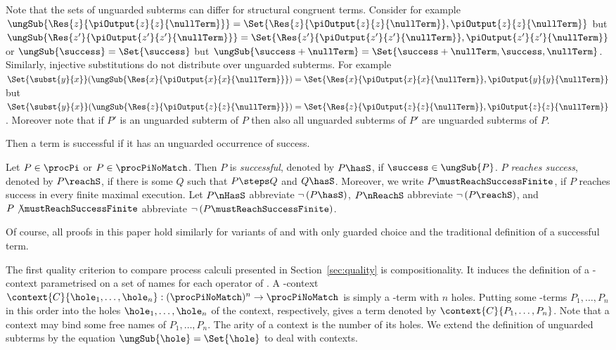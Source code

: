 \documentclass[final,copyright,creativecommons]{eptcs}
\begin{document}
\noindent
Note that the sets of unguarded subterms can differ for structural congruent terms. Consider for example $ \ungSub{\Res{z}{\piOutput{z}{z}{\nullTerm}}} = \Set{ \Res{z}{\piOutput{z}{z}{\nullTerm}}, \piOutput{z}{z}{\nullTerm} } $ but $ \ungSub{\Res{z'}{\piOutput{z'}{z'}{\nullTerm}}} = \Set{ \Res{z'}{\piOutput{z'}{z'}{\nullTerm}}, \piOutput{z'}{z'}{\nullTerm} } $
or $ \ungSub{\success} = \Set{ \success } $ but $ \ungSub{\success + \nullTerm} = \Set{ \success + \nullTerm, \success, \nullTerm } $.
Similarly, injective substitutions do not distribute over unguarded subterms.
For example $ \Set{ \subst{y}{x} }\!\left( \ungSub{\Res{x}{\piOutput{x}{x}{\nullTerm}}} \right) = \Set{ \Res{x}{\piOutput{x}{x}{\nullTerm}}, \piOutput{y}{y}{\nullTerm} } $ but $ \Set{ \subst{y}{x} }\!\left( \ungSub{\Res{z}{\piOutput{z}{z}{\nullTerm}}} \right) = \Set{ \Res{z}{\piOutput{z}{z}{\nullTerm}}, \piOutput{z}{z}{\nullTerm} } $.
Moreover note that if $ P' $ is an unguarded subterm of $ P $ then also all unguarded subterms of $ P' $ are unguarded subterms of $ P $.

Then a term is successful if it has an unguarded occurrence of success.

\begin{definition}
	Let $ P \in \procPi $ or $ P \in \procPiNoMatch $. Then $ P $ is \emph{successful}, denoted by $ P \hasS $, if $ \success \in \ungSub{P} $.
	\emph{$ P $ reaches success}, denoted by $ P \reachS $, if there is some $ Q $ such that $ P \steps Q $ and $ Q \hasS $.
	Moreover, we write $ P \mustReachSuccessFinite $, if $ P $ reaches success in every finite maximal execution.
Let $ P \nHasS $ abbreviate $ \neg \left( P \hasS \right) $, $ P \nReachS $ abbreviate $ \neg \left( P \reachS \right) $, and $ P \not\mustReachSuccessFinite $ abbreviate $ \neg \left( P \mustReachSuccessFinite \right) $.
\end{definition}

\noindent
Of course, all proofs in this paper hold similarly for variants of \piT and \piNM with only guarded choice and the traditional definition of a successful term.

The first quality criterion to compare process calculi presented in Section~\ref{sec:quality} is compositionality. It induces the definition of a \piNM-context parametrised on a set of names for each operator of \piT. A \piNM-context $ \context{C}{\hole_1, \ldots, \hole_n} : (\procPiNoMatch)^n \to \procPiNoMatch $ is simply a \piNM-term with $ n $ holes. Putting some \piNM-terms $ P_1, \ldots, P_n $ in this order into the holes $ \hole_1, \ldots, \hole_n $ of the context, respectively, gives a term denoted by $ \context{C}{P_1, \ldots, P_n} $. Note that a context may bind some free names of $ P_1, \ldots, P_n $. The arity of a context is the number of its holes. We extend the definition of unguarded subterms by the equation $ \ungSub{\hole} = \Set{ \hole } $ to deal with contexts.
\end{document}

